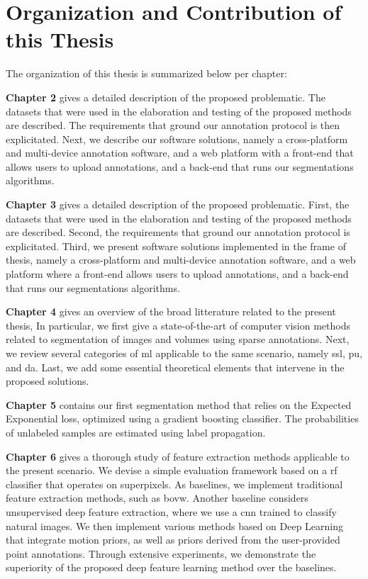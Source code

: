 \section{Organization and Contribution of this Thesis}
The organization of this thesis is summarized below per chapter:

\textbf{Chapter 2} gives a detailed description of the proposed problematic.
The datasets that were used in the elaboration and testing of the proposed methods are described.
The requirements that ground our annotation protocol is then explicitated.
Next, we describe our software solutions, namely a cross-platform and multi-device annotation software, and a web platform with a front-end that allows users to upload annotations, and a back-end that runs our segmentations algorithms.

\textbf{Chapter 3} gives a detailed description of the proposed problematic.
First, the datasets that were used in the elaboration and testing of the proposed methods are described.
Second, the requirements that ground our annotation protocol is explicitated.
Third, we present software solutions implemented in the frame of thesis, namely a cross-platform and multi-device annotation software, and a web platform where a front-end allows users to upload annotations, and a back-end that runs our segmentations algorithms.

\textbf{Chapter 4} gives an overview of the broad litterature related to the present thesis,
In particular, we first give a state-of-the-art of computer vision methods related to segmentation of images and volumes using sparse annotations.
Next, we review several categories of \gls{ml} applicable to the same scenario, namely \gls{ssl}, \gls{pu}, and \gls{da}.
Last, we add some essential theoretical elements that intervene in the proposed solutions.

\textbf{Chapter 5} contains our first segmentation method that relies on the Expected Exponential loss, optimized using a gradient boosting classifier. The probabilities of unlabeled samples are estimated using label propagation.

\textbf{Chapter 6} gives a thorough study of feature extraction methods applicable to the present scenario.
We devise a simple evaluation framework based on a \gls{rf} classifier that operates on superpixels.
As baselines, we implement traditional feature extraction methods, such as \gls{bovw}.
Another baseline considers unsupervised deep feature extraction, where we use a \gls{cnn} trained to classify natural images.
We then implement various methods based on Deep Learning that integrate motion priors, as well as priors derived from the user-provided point annotations.
Through extensive experiments, we demonstrate the superiority of the proposed deep feature learning method over the baselines.


